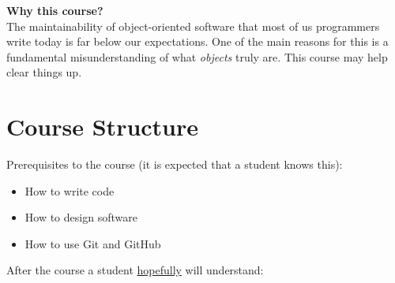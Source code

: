 \documentclass[nobrand,anonymous,nodate,nosecurity]{huawei}
\begin{document}
\textbf{Why this course?}\\
The maintainability of object-oriented software that most of us programmers write today is far below our expectations.
One of the main reasons for this is a fundamental misunderstanding of what \emph{objects} truly are.
This course may help clear things up.


\newpage
\section*{Course Structure}

Prerequisites to the course (it is expected that a student knows this):

\begin{itemize}
\item How to write code
\item How to design software
\item How to use Git and GitHub
\end{itemize}

After the course a student \ul{hopefully} will understand:
\end{document}
